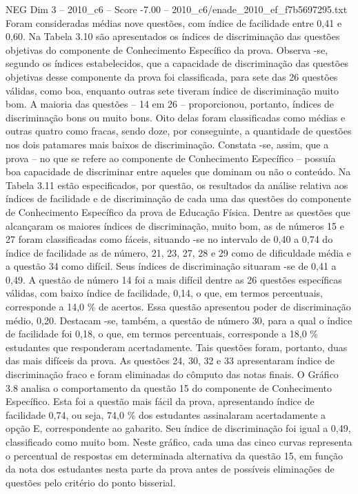 \begin{textsample}{NEG Dim 3 – 2010\_c6 – Score -7.00 – 2010\_c6/enade\_2010\_ef\_f7b5697295.txt}
Foram consideradas médias nove questões, com índice de facilidade entre 0,41 e 0,60.
Na Tabela 3.10 são apresentados os índices de discriminação das questões objetivas do componente de Conhecimento Específico da prova.
Observa -se, segundo os índices estabelecidos, que a capacidade de discriminação das questões objetivas desse componente da prova foi classificada, para sete das 26 questões válidas, como boa, enquanto outras sete tiveram índice de discriminação muito bom.
A maioria das questões – 14 em 26 – proporcionou, portanto, índices de discriminação bons ou muito bons.
Oito delas foram classificadas como médias e outras quatro como fracas, sendo doze, por conseguinte, a quantidade de questões nos dois patamares mais baixos de discriminação.
Constata -se, assim, que a prova – no que se refere ao componente de Conhecimento Específico – possuía boa capacidade de discriminar entre aqueles que dominam ou não o conteúdo.
Na Tabela 3.11 estão especificados, por questão, os resultados da análise relativa aos índices de facilidade e de discriminação de cada uma das questões do componente de Conhecimento Específico da prova de Educação Física.
Dentre as questões que alcançaram os maiores índices de discriminação, muito bom, as de números 15 e 27 foram classificadas como fáceis, situando -se no intervalo de 0,40 a 0,74 do índice de facilidade as de número, 21, 23, 27, 28 e 29 como de dificuldade média e a questão 34 como difícil.
Seus índices de discriminação situaram -se de 0,41 a 0,49.
A questão de número 14 foi a mais difícil dentre as 26 questões específicas válidas, com baixo índice de facilidade, 0,14, o que, em termos percentuais, corresponde a 14,0 \% de acertos.
Essa questão apresentou poder de discriminação médio, 0,20.
Destacam -se, também, a questão de número 30, para a qual o índice de facilidade foi 0,18, o que, em termos percentuais, corresponde a 18,0 \% estudantes que responderam acertadamente.
Tais questões foram, portanto, duas das mais difíceis da prova.
As questões 24, 30, 32 e 33 apresentaram índice de discriminação fraco e foram eliminadas do cômputo das notas finais.
O Gráfico 3.8 analisa o comportamento da questão 15 do componente de Conhecimento Específico.
Esta foi a questão mais fácil da prova, apresentando índice de facilidade 0,74, ou seja, 74,0 \% dos estudantes assinalaram acertadamente a opção E, correspondente ao gabarito.
Seu índice de discriminação foi igual a 0,49, classificado como muito bom.
Neste gráfico, cada uma das cinco curvas representa o percentual de respostas em determinada alternativa da questão 15, em função da nota dos estudantes nesta parte da prova antes de possíveis eliminações de questões pelo critério do ponto bisserial.

\end{textsample}
